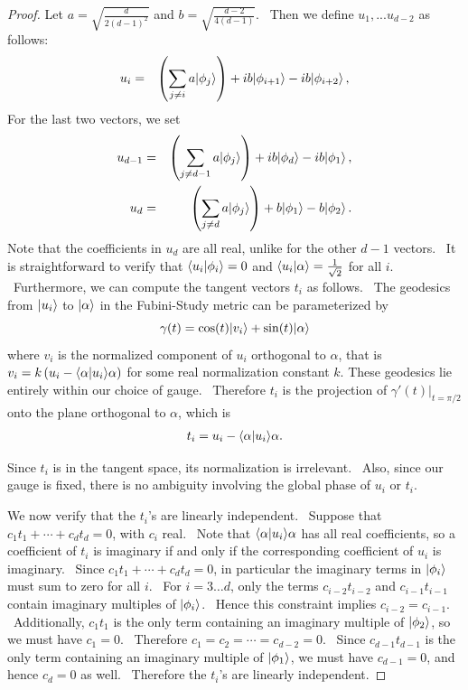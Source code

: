 \documentclass[letterpaper,11pt]{article}
\newcommand{\ban}{\begin{eqnarray*}}
\newcommand{\ean}{\end{eqnarray*}}
\newcommand{\braket}[2]{\mbox{$ \langle #1 | #2 \rangle $}}
\newcommand{\ket}[1]{\mbox{$ | #1 \rangle $}}
\begin{document}
\begin{proof}
Let $a=\sqrt{\frac{d}{2(d-1)^2}}$ and $b=\sqrt{\frac{d-2}{4(d-1)}}$. \ Then we define $u_1,...u_{d-2}$ as follows:
\ban u_i &=& \left(\sum_{j \neq i}a\ket{\phi_j}\right) + ib\ket{\phi_{i+1}} - ib\ket{\phi_{i+2}}\,, \ean
For the last two vectors, we set
\ban u_{d-1} &=& \left(\sum_{j \neq d-1}a\ket{\phi_j}\right) + ib\ket{\phi_d} - ib\ket{\phi_1}\,, \\
 u_d &=& \left( \sum_{j \neq d} a \ket{\phi_j}\right) + b \ket{\phi_1} - b \ket{\phi_2}\,. \ean
Note that the coefficients in $u_d$ are all real, unlike for the other $d-1$ vectors. \ It is straightforward to verify that $\braket{u_i}{\phi_i} =0$ and $\braket{u_i}{\alpha}=\frac{1}{\sqrt{2}}$ for all $i$. \ Furthermore, we can compute the tangent vectors $t_i$ as follows. \ The geodesics from $\ket{u_i}$ to $\ket{\alpha}$ in the Fubini-Study metric can be parameterized by
\[\gamma(t) = \cos(t)\ket{v_i} + \sin(t)\ket{\alpha}\]
where $v_i$ is the normalized component of $u_i$ orthogonal to $\alpha$, that is $v_i=k\left( u_i - \braket{\alpha}{u_i} \alpha\right)$ for some real normalization constant $k$. These geodesics lie entirely within our choice of gauge. \ Therefore $t_i$ is the projection of $\gamma'(t)|_{t=\pi/2}$ onto the plane orthogonal to $\alpha$, which is
\ban t_i = u_i - \braket{\alpha}{u_i} \alpha. \ean

Since $t_i$ is in the tangent space, its normalization is irrelevant. \ Also, since our gauge is fixed, there is no ambiguity involving the global phase of $u_i$ or $t_i$.

We now verify that the $t_i$'s are linearly independent. \ Suppose that $c_1 t_1 + \cdots + c_d t_d = 0$, with $c_i$ real. \ Note that $\braket{\alpha}{u_i} \alpha$ has all real coefficients, so a coefficient of $t_i$ is imaginary if and only if the corresponding coefficient of $u_i$ is imaginary. \ Since $c_1 t_1 + \cdots + c_d t_d = 0$, in particular the imaginary terms in $\ket{\phi_i}$ must sum to zero for all $i$. \ For $i=3\ldots d$, only the terms $c_{i-2}t_{i-2}$ and $c_{i-1} t_{i-1}$ contain imaginary multiples of $\ket{\phi_i}$. \ Hence this constraint implies $c_{i-2}=c_{i-1}$. \ Additionally, $c_1t_1$ is the only term containing an imaginary multiple of $\ket{\phi_2}$, so we must have $c_1=0$. \ Therefore $c_1=c_2=\cdots=c_{d-2}=0$. \ Since $c_{d-1}t_{d-1}$ is the only term containing an imaginary multiple of $\ket{\phi_1}$, we must have $c_{d-1}=0$, and hence $c_d=0$ as well. \ Therefore the $t_i$'s are linearly independent.
\end{proof}
\end{document}
